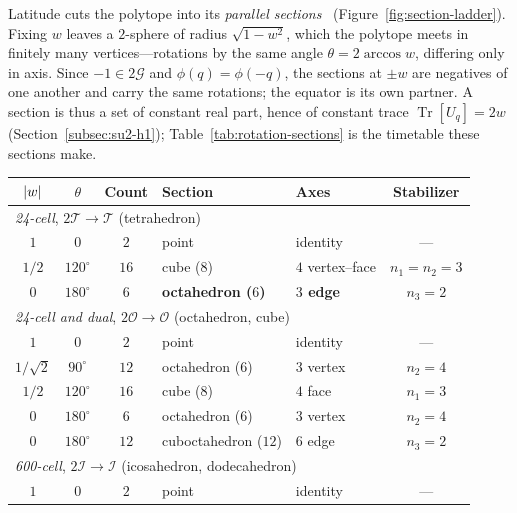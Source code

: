 \documentclass[11pt, oneside, openany]{scrbook}
\DeclareMathOperator{\Tr}{Tr}
\newcommand{\Tgroup}{\mathcal{T}}  %
\newcommand{\Ogroup}{\mathcal{O}}  %
\newcommand{\Igroup}{\mathcal{I}}  %
\newcommand{\Ggroup}{\mathcal{G}}
\newcommand{\TwoT}{2\Tgroup}
\newcommand{\TwoO}{2\Ogroup}
\newcommand{\TwoI}{2\Igroup}
\newcommand{\TwoG}{2\Ggroup}
\DeclarePairedDelimiter{\abs}{\lvert}{\rvert}
\begin{document}
Latitude cuts the polytope into its \textit{parallel sections}~\cite[\S13.1]{coxeter1973regularpolytopes} (Figure~\ref{fig:section-ladder}). Fixing $w$ leaves a $2$-sphere of radius $\sqrt{1 - w^2}$, which the polytope meets in finitely many vertices---rotations by the same angle $\theta = 2\arccos w$, differing only in axis. Since $-1 \in \TwoG$ and $\phi(q) = \phi(-q)$, the sections at $\pm w$ are negatives of one another and carry the same rotations; the equator is its own partner. A section is thus a set of constant real part, hence of constant trace $\Tr[U_q] = 2w$ (Section~\ref{subsec:su2-h1}); Table~\ref{tab:rotation-sections} is the timetable these sections make.
\begin{table}[h]
\centering
\begin{tabular}{cccllc}
\toprule
$\abs{w}$ & $\theta$ & Count & Section & Axes & Stabilizer \\
\midrule
\multicolumn{6}{l}{\textit{24-cell}, $\TwoT \to \Tgroup$ (tetrahedron)} \\
$1$          & $0$         & $2$  & point                    & identity          & --- \\
$1/2$        & $120^\circ$ & $16$ & cube ($8$)               & $4$ vertex--face  & $n_1 = n_2 = 3$ \\
\boldmath\bfseries $0$ & \boldmath\bfseries $180^\circ$ & \boldmath\bfseries $6$ & \boldmath\bfseries octahedron ($6$) & \boldmath\bfseries $3$ edge & \boldmath\bfseries $n_3 = 2$ \\\midrule
\multicolumn{6}{l}{\textit{24-cell and dual}, $\TwoO \to \Ogroup$ (octahedron, cube)} \\
$1$          & $0$         & $2$  & point                    & identity          & --- \\
$1/\sqrt{2}$ & $90^\circ$  & $12$ & octahedron ($6$)         & $3$ vertex        & $n_2 = 4$ \\
$1/2$        & $120^\circ$ & $16$ & cube ($8$)               & $4$ face          & $n_1 = 3$ \\
$0$          & $180^\circ$ & $6$  & octahedron ($6$)         & $3$ vertex        & $n_2 = 4$ \\
$0$          & $180^\circ$ & $12$ & cuboctahedron ($12$)     & $6$ edge          & $n_3 = 2$ \\
\midrule
\multicolumn{6}{l}{\textit{600-cell}, $\TwoI \to \Igroup$ (icosahedron, dodecahedron)} \\
$1$          & $0$         & $2$  & point                    & identity          & --- \\

\end{tabular}
\end{table}
\end{document}
